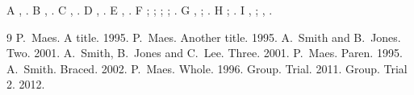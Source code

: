\documentclass{article}
\begin{document}
A \citep{maes}, \citet{maes}. B \citep{maesa}, \citet{maesa}. C \citep{sj}, \citet{sj}. D \citep{sea}, \citet{sea}.
E \citep{paren}, \citet{paren}. F \citealp{maes}; \citeauthor{maes}; \citeyear{maes}; \citeyearpar{maes};
\citealt{maes}. G \citep{braced}, \citet{braced}; \citep{whole}. H \citet*{maes}; \citep*{maes}. I \citep{grp},
\citet{grp}; \citep{grpp}, \citet{grpp}.
\begin{thebibliography}{9}
 P.~Maes. A title. 1995.
 P.~Maes. Another title. 1995.
 A.~Smith and B.~Jones. Two. 2001.
 A.~Smith, B.~Jones and C.~Lee. Three. 2001.
 P.~Maes. Paren. 1995.
 A.~Smith. Braced. 2002.
 P.~Maes. Whole. 1996.
 Group. Trial. 2011.
 Group. Trial 2. 2012.
\end{thebibliography}
\end{document}
